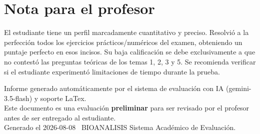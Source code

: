 \documentclass[11pt,a4paper]{article}
\begin{document}
\section*{Nota para el profesor}
\begin{tcolorbox}[
  enhanced, breakable,
  colback=yellow!8, colframe=yellow!60!black,
  fonttitle=\bfseries, coltitle=black,
  title={Observaciones para revisión manual},
  top=4pt, bottom=4pt, left=8pt, right=8pt,
]
El estudiante tiene un perfil marcadamente cuantitativo y preciso. Resolvió a la perfección todos los ejercicios prácticos/numéricos del examen, obteniendo un puntaje perfecto en esos incisos. Su baja calificación se debe exclusivamente a que no contestó las preguntas teóricas de los temas 1, 2, 3 y 5. Se recomienda verificar si el estudiante experimentó limitaciones de tiempo durante la prueba.
\end{tcolorbox}

\vspace{12pt}
\begin{center}
  \footnotesize\color{gray}
  Informe generado automáticamente por el sistema de evaluación con IA (gemini-3.5-flash) y soporte LaTex. \\
  Este documento es una evaluación \textbf{preliminar} para ser revisado por el profesor antes de ser entregado al 
  estudiante. \\
  Generado el 2026-08-08 \textbullet\ BIOANALISIS Sistema Académico de Evaluación.
  \end{center}
\end{document}

